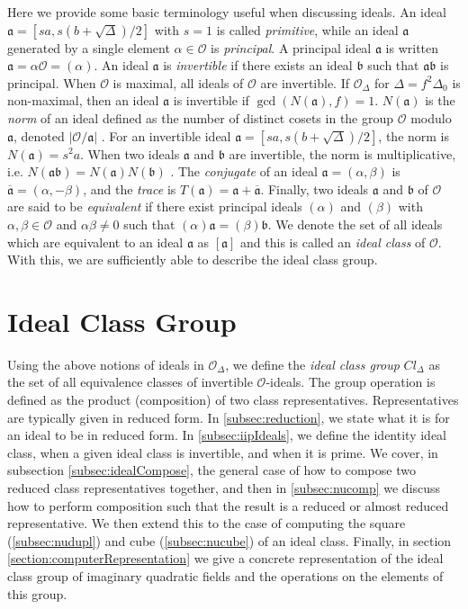 \documentclass{ucalgthes1}
\theoremstyle{plain}
\theoremstyle{definition}
\newcommand{\OO}{\mathcal{O}}
\begin{document}
Here we provide some basic terminology useful when discussing ideals.  An ideal $\mathfrak{a} = [sa, s(b+\sqrt{\Delta})/2]$ with $s=1$ is called \emph{primitive}, while an ideal $\mathfrak{a}$ generated by a single element $\alpha \in \OO$ is \emph{principal}. A principal ideal $\mathfrak a$ is written $\mathfrak{a} = \alpha \OO = (\alpha)$.  An ideal $\mathfrak{a}$ is \emph{invertible} if there exists an ideal $\mathfrak{b}$ such that $\mathfrak{a}\mathfrak{b}$ is principal.  When $\OO$ is maximal, all ideals of $\OO$ are invertible.  If $\OO_\Delta$ for $\Delta = f^2\Delta_0$ is non-maximal, then an ideal $\mathfrak{a}$ is invertible if $\gcd(N(\mathfrak{a}),f)=1$.  $N(\mathfrak{a})$ is the \emph{norm} of an ideal defined as the number of distinct cosets in the group $\OO$ modulo $\mathfrak{a}$, denoted $|\OO/\mathfrak{a}|$ \cite[pp.~90-91]{Jac09}.  For an invertible ideal $\mathfrak{a} = [sa, s(b+\sqrt{\Delta})/2]$, the norm is $N(\mathfrak{a}) = s^2a$.  When two ideals $\mathfrak{a}$ and $\mathfrak{b}$ are invertible, the norm is multiplicative, i.e. $N(\mathfrak{a}\mathfrak{b}) = N(\mathfrak{a})N(\mathfrak{b})$ \cite[p.~92]{Jac09}.  The \emph{conjugate} of an ideal $\mathfrak{a} = (\alpha, \beta)$ is $\overline{\mathfrak{a}} = (\alpha, -\beta)$, and the \emph{trace} is $T(\mathfrak a) = \mathfrak a + \overline{\mathfrak a}$.  Finally, two ideals $\mathfrak{a}$ and $\mathfrak{b}$ of $\OO$ are said to be \emph{equivalent} if there exist principal ideals $(\alpha)$ and $(\beta)$ with  $\alpha, \beta \in \OO$ and $\alpha\beta \neq 0$ such that $(\alpha)\mathfrak{a} = (\beta)\mathfrak{b}$.  We denote the set of all ideals which are equivalent to an ideal $\mathfrak{a}$ as $[\mathfrak{a}]$ and this is called an \emph{ideal class} of $\OO$.  With this, we are  sufficiently able to describe the ideal class group.


\bigbreak
\section{Ideal Class Group}

Using the above notions of ideals in $\OO_\Delta$, we define the \emph{ideal class group} $Cl_\Delta$ as the set of all equivalence classes of invertible $\OO$-ideals.  The group operation is defined as the product (composition) of two class representatives.  Representatives are typically given in reduced form.  In \ref{subsec:reduction}, we state what it is for an ideal to be in reduced form.  In \ref{subsec:iipIdeals}, we define the identity ideal class, when a given ideal class is invertible, and when it is prime.  We cover, in subsection \ref{subsec:idealCompose}, the general case of how to compose two reduced class representatives together, and then in \ref{subsec:nucomp} we discuss how to perform composition such that the result is a reduced or almost reduced representative.  We then extend this to the case of computing the square (\ref{subsec:nudupl}) and cube (\ref{subsec:nucube}) of an ideal class.  Finally, in section \ref{section:computerRepresentation} we give a concrete representation of the ideal class group of imaginary quadratic fields and the operations on the elements of this group. 
\end{document}
